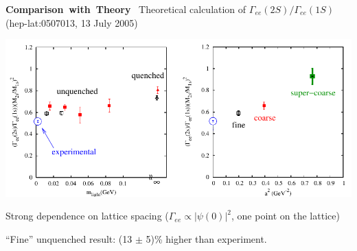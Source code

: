 \documentclass[landscape]{article}
\newenvironment{slide}[1][ ]{\mbox{\bf #1 } \vfill}{\vfill \mbox{ } \pagebreak}
\begin{document}
\begin{slide}[Comparison with Theory]
  Theoretical calculation of $\Gamma_{ee}(2S)/\Gamma_{ee}(1S)$ (hep-lat:0507013, 13 July 2005)

  \vfill
  \begin{center}
    \includegraphics[width=\linewidth]{dependence}
  \end{center}

  \vfill
  Strong dependence on lattice spacing ($\Gamma_{ee} \propto |\psi(0)|^2$, one point on the lattice)

  \vfill
  ``Fine'' unquenched result: (13 $\pm$ 5)\% higher than experiment.

\end{slide}
\end{document}
